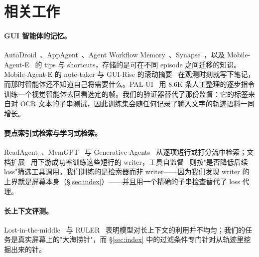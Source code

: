 \section{相关工作}
\paragraph{GUI 智能体的记忆。} AutoDroid~\citep{autodroid}、AppAgent~\citep{appagent}、Agent Workflow Memory~\citep{awm}、Synapse~\citep{synapse}，以及 Mobile-Agent-E~\citep{mobileagente} 的 tips 与 shortcuts，存储的是可在不同 episode 之间迁移的知识。Mobile-Agent-E 的 note-taker 与 GUI-Rise 的滚动摘要~\citep{guirise} 在观测时刻就写下笔记，而那时智能体还不知道自己将需要什么。PAL-UI~\citep{palui} 用 8.6K 条人工整理的逐步指令训练一个视觉智能体去回看选定的帧。我们的验证器替代了那份监督：它的标签来自对 OCR 文本的子串测试，因此训练集会随任何记录了输入文字的轨迹语料一同增长。

\paragraph{要点索引式检索与学习式检索。} ReadAgent~\citep{readagent}、MemGPT~\citep{memgpt} 与 Generative Agents~\citep{generativeagents} 从逐项短行或打分流中检索；文档扩展~\citep{doc2query} 用下游成功率训练这些短行的 writer，工具自监督~\citep{toolformer} 则按"是否降低后续 loss"筛选工具调用。我们训练的是检索器而非 writer——因为我们发现 writer 的上界就是屏幕本身（\S\ref{sec:index}）——并且用一个精确的子串检查替代了 loss 代理。

\paragraph{长上下文评测。} Lost-in-the-middle~\citep{lostmiddle} 与 RULER~\citep{ruler} 表明模型对长上下文的利用并不均匀；我们的任务是真实屏幕上的"大海捞针"，而 \S\ref{sec:index} 中的过滤条件专门针对从轨迹里挖掘出来的针。
